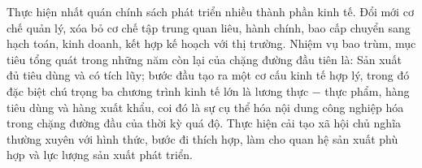 Thực hiện nhất quán chính sách phát triển nhiều thành phần kinh tế. Đổi mới cơ chế quản lý, xóa bỏ cơ chế tập trung quan liêu, hành chính, bao cấp chuyển sang hạch toán, kinh doanh, kết hợp kế hoạch với thị trường. Nhiệm vụ bao trùm, mục tiêu tổng quát trong những năm còn lại của chặng đường đầu tiên là: Sản xuất đủ tiêu dùng và có tích lũy; bước đầu tạo ra một cơ cấu kinh tế hợp lý, trong đó đặc biệt chú trọng ba chương trình kinh tế lớn là lương thực $-$ thực phẩm, hàng tiêu dùng và hàng xuất khẩu, coi đó là sự cụ thể hóa nội dung công nghiệp hóa trong chặng đường đầu của thời kỳ quá độ. Thực hiện cải tạo xã hội chủ nghĩa thường xuyên với hình thức, bước đi thích hợp, làm cho quan hệ sản xuất phù hợp và lực lượng sản xuất phát triển.